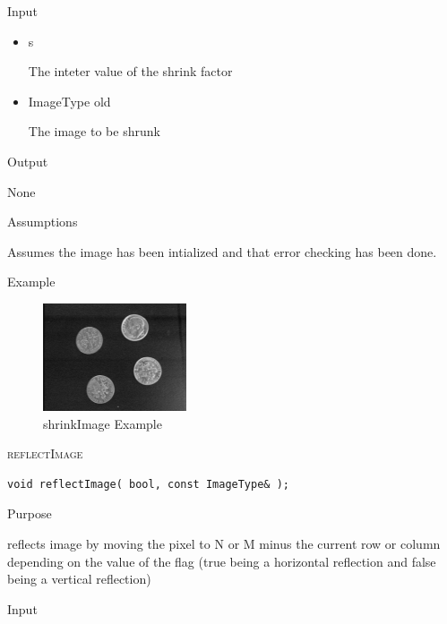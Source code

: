 \documentclass[pdftex, 11pt]{article}
\begin{document}
\begin{description}
\begin{description}
			\item{Input}

				\begin{itemize}

					\item{s}

						The inteter value of the shrink factor

					\item{ImageType old}

						The image to be shrunk

				\end{itemize}

			\item{Output}

				None

			\item{Assumptions}

				Assumes the image has been intialized and that error
				checking has been done.

			\item{Example}

				\begin{figure}[ht!]
					\centering
					\caption{shrinkImage Example}
				\includegraphics{images/outshrink.png}
			\end{figure}

		\end{description}


	\item{\textsc{reflectImage}}
		\begin{description}

\begin{lstlisting}
void reflectImage( bool, const ImageType& );
\end{lstlisting}

			\item{Purpose}

				reflects image by moving the pixel to N or M
				minus the current row or column
				depending on the value of the flag
				(true being a horizontal reflection and
				false being a vertical reflection)

			\item{Input}


\end{description}
\end{description}
\end{document}
